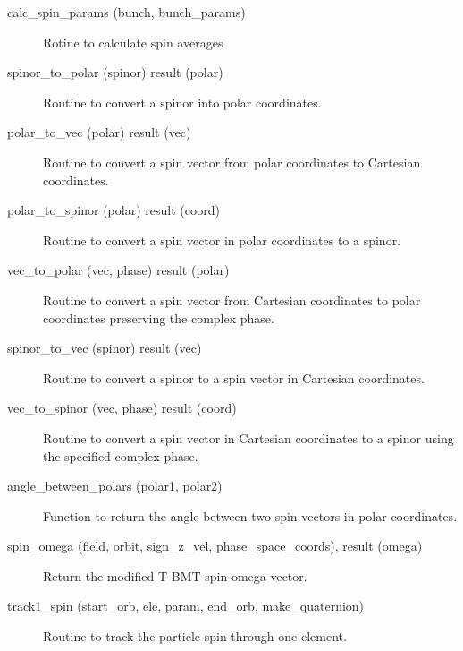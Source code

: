 \begin{description}

\label{r:calc.spin.params}
\item[calc_spin_params (bunch, bunch_params)] \Newline 
Rotine to calculate spin averages

\label{r:spinor.to.polar}
\item[spinor_to_polar (spinor) result (polar)] \Newline 
Routine to convert a spinor into polar coordinates.

\label{r:polar.to.vec}
\item[polar_to_vec (polar) result (vec)] \Newline
Routine to convert a spin vector from polar coordinates to Cartesian coordinates.

\label{r:polar.to.spinor}
\item[polar_to_spinor (polar) result (coord)] \Newline
Routine to convert a spin vector in polar coordinates to a spinor.

\label{r:vec.to.polar}
\item[vec_to_polar (vec, phase) result (polar)] \Newline
Routine to convert a spin vector from Cartesian coordinates to polar coordinates 
preserving the complex phase.

\label{r:spinor.to.vec}
\item[spinor_to_vec (spinor) result (vec)] \Newline
Routine to convert a spinor to a spin vector in Cartesian coordinates.

\label{r:vec.to.spinor}
\item[vec_to_spinor (vec, phase) result (coord)] \Newline
Routine to convert a spin vector in Cartesian coordinates to a spinor using
the specified complex phase.

\label{r:angle.between.polars}
\item[angle_between_polars (polar1, polar2)] \Newline
Function to return the angle between two spin vectors in polar coordinates.

\label{r:spin.omega}
\item[spin_omega (field, orbit, sign_z_vel, phase_space_coords), result (omega)] \Newline 
Return the modified T-BMT spin omega vector.

\label{r:track1.spin}
\item[track1_spin (start_orb, ele, param, end_orb, make_quaternion)] \Newline
Routine to track the particle spin through one element.

\end{description}

